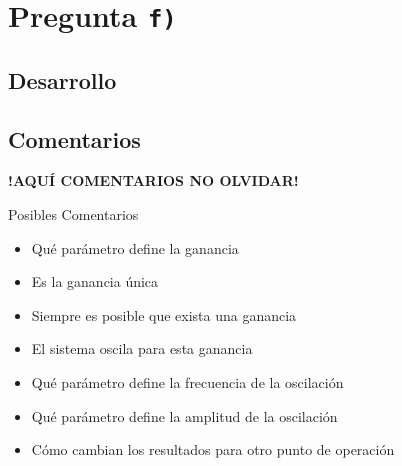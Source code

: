 \section{Pregunta \texttt{f)}}\label{pregunta-f}


\subsection{Desarrollo}

\FloatBarrier
\subsection{Comentarios}


\textbf{!AQUÍ COMENTARIOS NO OLVIDAR!}

Posibles Comentarios
\begin{itemize}
    \item Qué parámetro define la ganancia
    \item Es la ganancia única
    \item Siempre es posible que exista una ganancia
    \item El sistema oscila para esta ganancia
    \item Qué parámetro define la frecuencia de la oscilación
    \item Qué parámetro define la amplitud de la oscilación
    \item Cómo cambian los resultados para otro punto de operación
\end{itemize}